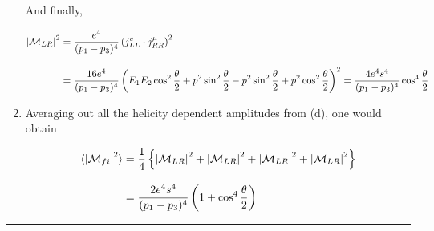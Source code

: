 \begin{solution}
\begin{enumerate}[label=(\alph*)]
        And finally, 

            \begin{align*}
                \left|\mathcal{M}_{LR}\right|^2 &= \frac{e^4}{(p_1-p_3)^4} \left(j^e_{LL}\cdot j^\mu_{RR}\right)^2  \\[0.125in] 
                &= \frac{16e^4}{(p_1-p_3)^4} \left( E_1E_2\cos^2\frac{\theta}{2} + p^2 \sin^2\frac{\theta}{2} - p^2 \sin^2\frac{\theta}{2} + p^2 \cos^2\frac{\theta}{2} \right)^2 = \frac{4e^4s^4}{(p_1-p_3)^4}  \cos^4\frac{\theta}{2} \\
            \end{align*}

        \item Averaging out all the helicity dependent amplitudes from (d), one would obtain 
        
            \begin{align*}
                \langle \left|\mathcal{M}_{fi}\right|^2 \rangle &= \frac{1}{4} \left\{ \left|\mathcal{M}_{LR}\right|^2 + \left|\mathcal{M}_{LR}\right|^2  + \left|\mathcal{M}_{LR}\right|^2  + \left|\mathcal{M}_{LR}\right|^2  \right\} \\[0.12in]
                &= \frac{2e^4s^4}{(p_1-p_3)^4} \left( 1+ \cos^4\frac{\theta}{2} \right)
            \end{align*}
    \end{enumerate}
\end{solution}

\noindent\rule{7in}{1.5pt}



